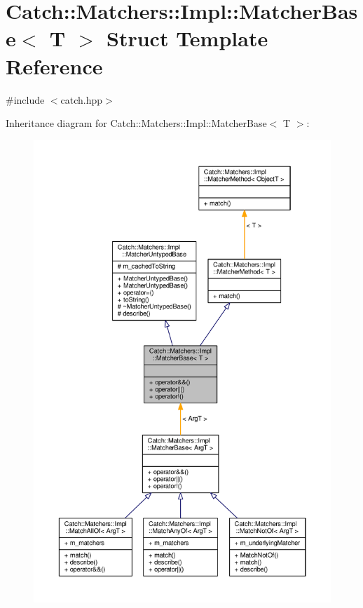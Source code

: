 \hypertarget{struct_catch_1_1_matchers_1_1_impl_1_1_matcher_base}{\section{Catch\-:\-:Matchers\-:\-:Impl\-:\-:Matcher\-Base$<$ T $>$ Struct Template Reference}
\label{struct_catch_1_1_matchers_1_1_impl_1_1_matcher_base}
}


{\ttfamily \#include $<$catch.\-hpp$>$}



Inheritance diagram for Catch\-:\-:Matchers\-:\-:Impl\-:\-:Matcher\-Base$<$ T $>$\-:
\nopagebreak
\begin{figure}[H]
\begin{center}
\leavevmode
\includegraphics[width=350pt]{struct_catch_1_1_matchers_1_1_impl_1_1_matcher_base__inherit__graph}
\end{center}
\end{figure}


